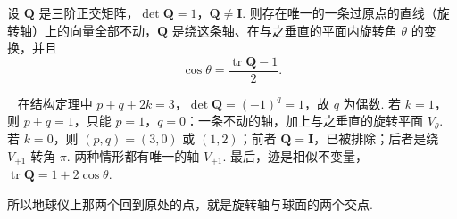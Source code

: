 \documentclass[lang=cn,10.5pt,scheme=chinese,toc=twocol,section,chinesefont=nofont,
twoside,citestyle=gb7714-2015,bibstyle=gb7714-2015]{elegantbook}
\DeclareRobustCommand{\textbf}[1]{{\lnsemiboldlatin\lnsemiboldcjk #1}}
\newcommand{\vv}[1]{\boldsymbol{#1}}
\numberwithin{equation}{section}   %
\newcommand*{\lnlabel}[1]{{\sffamily\bfseries\color{black}#1}}
\renewenvironment{proof}{%
	\par\noindent\lnlabel{\proofname}\;\ \color{black!90}\cfs}{\par}
\begin{document}
\begin{corollary}[欧拉旋转定理]\label{cor:euler}
  设 $\vv Q$ 是三阶正交矩阵，$\det\vv Q=1$，$\vv Q\ne\vv I$. 则存在唯一的一条过原点的直线（\textbf{旋转轴}）上的向量全部不动，$\vv Q$ 是绕这条轴、在与之垂直的平面内旋转角 $\theta$ 的变换，并且
  \[\cos\theta=\frac{\operatorname{tr}\vv Q-1}2.\]
\end{corollary}
\begin{proof}
  在结构定理中 $p+q+2k=3$，$\det\vv Q=(-1)^q=1$，故 $q$ 为偶数. 若 $k=1$，则 $p+q=1$，只能 $p=1$，$q=0$：一条不动的轴，加上与之垂直的旋转平面 $V_\theta$. 若 $k=0$，则 $(p,q)=(3,0)$ 或 $(1,2)$；前者 $\vv Q=\vv I$，已被排除；后者是绕 $V_{+1}$ 转角 $\pi$. 两种情形都有唯一的轴 $V_{+1}$. 最后，迹是相似不变量，$\operatorname{tr}\vv Q=1+2\cos\theta$.
\end{proof}

所以地球仪上那两个回到原处的点，就是旋转轴与球面的两个交点.
\end{document}
